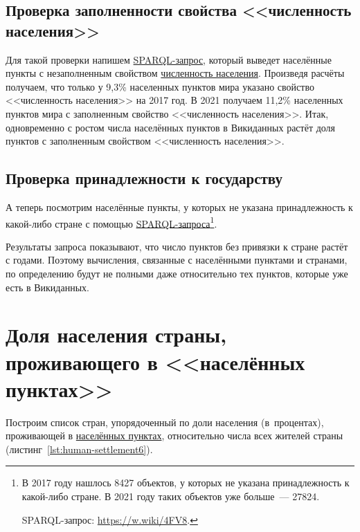 \subsection{Проверка заполненности свойства <<численность населения>> }

Для такой проверки напишем \href{https://w.wiki/4FUz}{SPARQL-запрос}, 
который выведет населённые пункты 
с незаполненным свойством \href{http://www.wikidata.org/entity/P1082}{численность населения}. 
Произведя расчёты получаем, что только у 9,3\% населенных пунктов мира 
указано свойство <<численность населения>> на 2017 год. 
В 2021 получаем 11,2\% населенных пунктов мира с заполненным свойство <<численность населения>>. 
Итак, одновременно с ростом числа населённых пунктов в Викиданных 
растёт доля пунктов с заполненным свойством <<численность населения>>.


\subsection{Проверка принадлежности к государству}

А теперь посмотрим населённые пункты, 
у которых не указана принадлежность к какой-либо стране 
с помощью \href{https://w.wiki/4FV8}{SPARQL-запроса}\footnote{%
%
В 2017 году нашлось \num{8427} объектов, у которых не указана принадлежность к какой-либо стране. 
В 2021 году таких объектов уже больше~--- \num{27824}. 

SPARQL-запрос: \href{https://w.wiki/4FV8}{https://w.wiki/4FV8}.%
}. 

Результаты запроса показывают, что число пунктов без привязки к стране растёт с годами. 
Поэтому вычисления, связанные с населёнными пунктами и странами, 
по определению будут не полными даже относительно тех пунктов, которые уже есть в Викиданных. 


\section{Доля населения страны, проживающего в <<населённых пунктах>>}

Построим список стран, 
упорядоченный по доли населения (в~процентах), проживающей в \href{http://www.wikidata.org/entity/Q486972}{населённых пунктах}, относительно числа всех жителей страны (листинг~\ref{lst:human-settlement6}).

